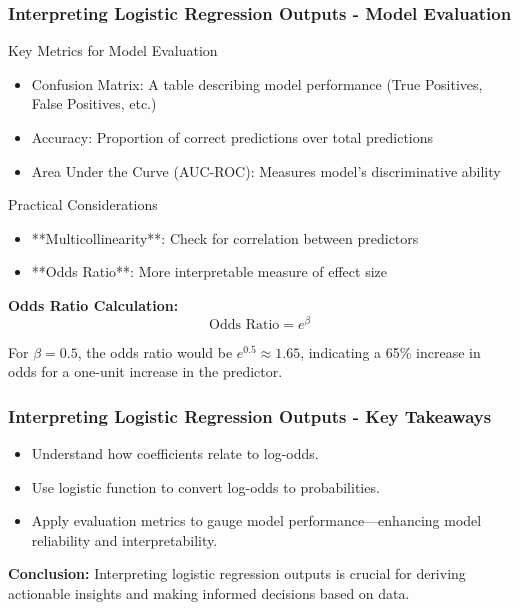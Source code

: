 \documentclass[aspectratio=169]{beamer}
\begin{document}
\begin{frame}[fragile]
    \frametitle{Interpreting Logistic Regression Outputs - Model Evaluation}
    \begin{block}{Key Metrics for Model Evaluation}
        \begin{itemize}
            \item Confusion Matrix: A table describing model performance (True Positives, False Positives, etc.)
            \item Accuracy: Proportion of correct predictions over total predictions
            \item Area Under the Curve (AUC-ROC): Measures model's discriminative ability
        \end{itemize}
    \end{block}

    \begin{block}{Practical Considerations}
        \begin{itemize}
            \item **Multicollinearity**: Check for correlation between predictors
            \item **Odds Ratio**: More interpretable measure of effect size
        \end{itemize}
        
        \textbf{Odds Ratio Calculation:}
        \begin{equation}
            \text{Odds Ratio} = e^{\beta}
        \end{equation}

        For \( \beta = 0.5 \), the odds ratio would be \( e^{0.5} \approx 1.65 \), indicating a 65\% increase in odds for a one-unit increase in the predictor.
    \end{block}
\end{frame}

\begin{frame}[fragile]
    \frametitle{Interpreting Logistic Regression Outputs - Key Takeaways}
    \begin{itemize}
        \item Understand how coefficients relate to log-odds.
        \item Use logistic function to convert log-odds to probabilities.
        \item Apply evaluation metrics to gauge model performance—enhancing model reliability and interpretability.
    \end{itemize}

    \textbf{Conclusion:} Interpreting logistic regression outputs is crucial for deriving actionable insights and making informed decisions based on data.
\end{frame}
\end{document}
